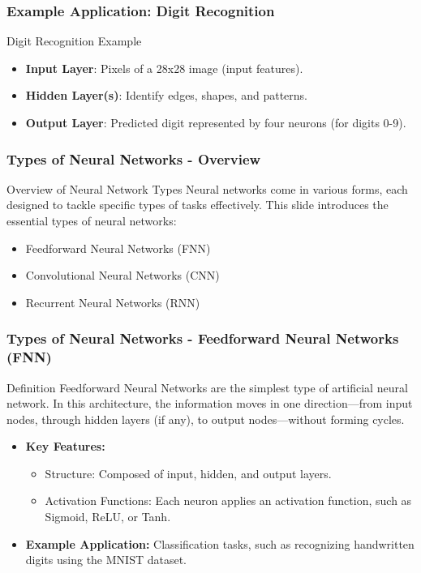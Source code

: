 \documentclass{beamer}
\begin{document}
\begin{frame}[fragile]
    \frametitle{Example Application: Digit Recognition}
    \begin{block}{Digit Recognition Example}
        \begin{itemize}
            \item \textbf{Input Layer}: Pixels of a 28x28 image (input features).
            \item \textbf{Hidden Layer(s)}: Identify edges, shapes, and patterns.
            \item \textbf{Output Layer}: Predicted digit represented by four neurons (for digits 0-9).
        \end{itemize}
    \end{block}
\end{frame}

\begin{frame}
    \frametitle{Types of Neural Networks - Overview}
    \begin{block}{Overview of Neural Network Types}
        Neural networks come in various forms, each designed to tackle specific types of tasks effectively. 
        This slide introduces the essential types of neural networks:
        \begin{itemize}
            \item Feedforward Neural Networks (FNN)
            \item Convolutional Neural Networks (CNN)
            \item Recurrent Neural Networks (RNN)
        \end{itemize}
    \end{block}
\end{frame}

\begin{frame}
    \frametitle{Types of Neural Networks - Feedforward Neural Networks (FNN)}
    \begin{block}{Definition}
        Feedforward Neural Networks are the simplest type of artificial neural network. 
        In this architecture, the information moves in one direction—from input nodes, through hidden layers (if any), to output nodes—without forming cycles.
    \end{block}
    
    \begin{itemize}
        \item \textbf{Key Features:}
        \begin{itemize}
            \item Structure: Composed of input, hidden, and output layers.
            \item Activation Functions: Each neuron applies an activation function, such as Sigmoid, ReLU, or Tanh.
        \end{itemize}
        \item \textbf{Example Application:} Classification tasks, such as recognizing handwritten digits using the MNIST dataset.
    \end{itemize}
\end{frame}
\end{document}
